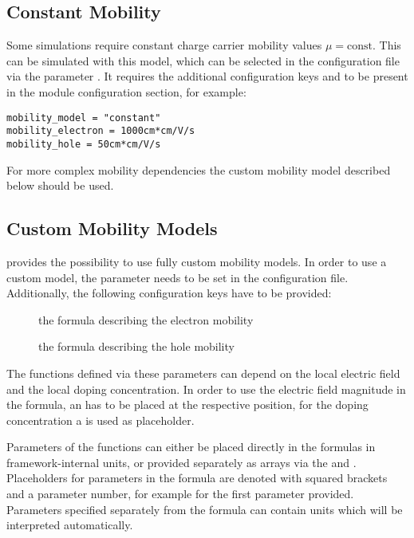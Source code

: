 \subsection{Constant Mobility}

Some simulations require constant charge carrier mobility values $\mu = \textrm{const}$.
This can be simulated with this model, which can be selected in the configuration file via the parameter .
It requires the additional configuration keys  and  to be present in the module configuration section, for example:

\begin{verbatim}
mobility_model = "constant"
mobility_electron = 1000cm*cm/V/s
mobility_hole = 50cm*cm/V/s
\end{verbatim}

For more complex mobility dependencies the custom mobility model described below should be used.

\subsection{Custom Mobility Models}
\apsq provides the possibility to use fully custom mobility models.
In order to use a custom model, the parameter  needs to be set in the configuration file.
Additionally, the following configuration keys have to be provided:
\begin{description}
    \item[] the formula describing the electron mobility
    \item[] the formula describing the hole mobility
\end{description}

The functions defined via these parameters can depend on the local electric field and the local doping concentration.
In order to use the electric field magnitude in the formula, an  has to be placed at the respective position, for the doping concentration a  is used as placeholder.

Parameters of the functions can either be placed directly in the formulas in framework-internal units, or provided separately as arrays via the  and .
Placeholders for parameters in the formula are denoted with squared brackets and a parameter number, for example \parameter{[0]} for the first parameter provided.
Parameters specified separately from the formula can contain units which will be interpreted automatically.

